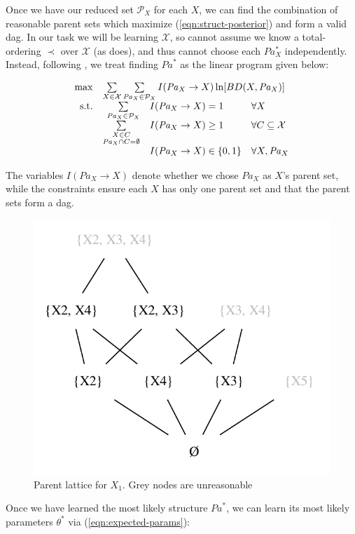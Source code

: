 \documentclass{article}
\newcommand{\Pa}{\mathit{Pa}}
\renewcommand{\dag}{{\sc dag}}
\begin{document}
	Once we have our reduced set $\mathcal{P}_X$ for each $X$, we can find the combination of reasonable parent sets which maximize (\ref{eqn:struct-posterior}) and form a valid \dag{}. In our task we will be learning $\mathcal{X}$, so cannot assume we know a total-ordering $\prec$ over $\mathcal{X}$ (as \citet{buntine_theory_1991} does), and thus cannot choose each $Pa_X^*$ independently. Instead, following \citet{bartlett_integer_2017}, we treat finding $\Pa^*$ as the linear program given below:
	
	\begin{equation}
	\begin{array}{rrllcl}
	\displaystyle \max & \multicolumn{3}{l}{\sum\limits_{X \in \mathcal{X}}\sum\limits_{\Pa_X \in \mathcal{P}_X} I(\Pa_X \rightarrow X) \ln[BD(X, \Pa_X)] } \\
	\textrm{s.t.} & \sum\limits_{\Pa_X \in \mathcal{P}_X} &I(\Pa_X \rightarrow X) = 1 & \forall X \\
	&\sum\limits_{\substack{X \in C \\ \Pa_X \cap C = \emptyset}} &I(\Pa_X \rightarrow X) \geq 1 & \forall C \subseteq \mathcal{X}\\
	&&I(\Pa_X \rightarrow X) \in \{0, 1\} & \forall X, \Pa_X\\
	\end{array}
	\label{eqn:ilp}
	\end{equation}
	
	The variables $I(\Pa_X \rightarrow X)$ denote whether we chose $\Pa_X$ as $X$'s parent set, while the constraints ensure each $X$ has only one parent set and that the parent sets form a \dag{}.
	
	\begin{figure}
		\centering
		\includegraphics[width=0.5\linewidth]{buntineLattice}
		\caption{Parent lattice for $X_1$. Grey nodes are unreasonable}
		\label{fig:buntine-lattice}
	\end{figure}
		
	Once we have learned the most likely structure $\Pa^*$, we can learn its most likely parameters $\theta^*$ via (\ref{eqn:expected-params}):
	
\end{document}

